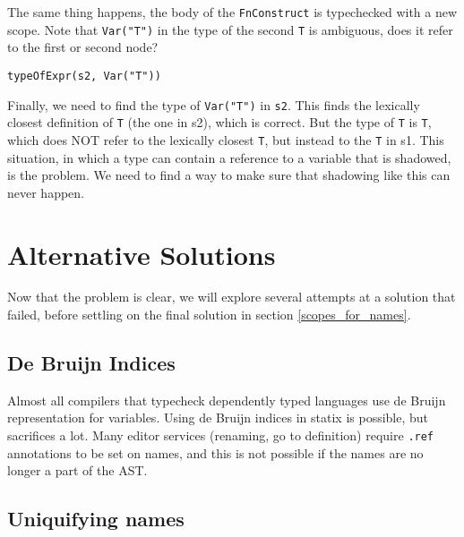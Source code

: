 \noindent
The same thing happens, the body of the \verb|FnConstruct| is typechecked with a new scope. Note that \verb|Var("T")| in the type of the second \verb|T| is ambiguous, does it refer to the first or second node?

\begin{lstlisting}
typeOfExpr(s2, Var("T"))
\end{lstlisting}

Finally, we need to find the type of \verb|Var("T")| in \verb|s2|. This finds the lexically closest definition of \verb|T| (the one in s2), which is correct. But the type of \verb|T| is \verb|T|, which does NOT refer to the lexically closest \verb|T|, but instead to the \verb|T| in s1. This situation, in which a type can contain a reference to a variable that is shadowed, is the problem. We need to find a way to make sure that shadowing like this can never happen.

\section{Alternative Solutions}

Now that the problem is clear, we will explore several attempts at a solution that failed, before settling on the final solution in section \ref{scopes_for_names}.

\subsection{De Bruijn Indices}

Almost all compilers that typecheck dependently typed languages use de Bruijn representation for variables. Using de Bruijn indices in statix is possible, but sacrifices a lot. Many editor services (renaming, go to definition) require \verb|.ref| annotations to be set on names, and this is not possible if the names are no longer a part of the AST.

\subsection{Uniquifying names}

